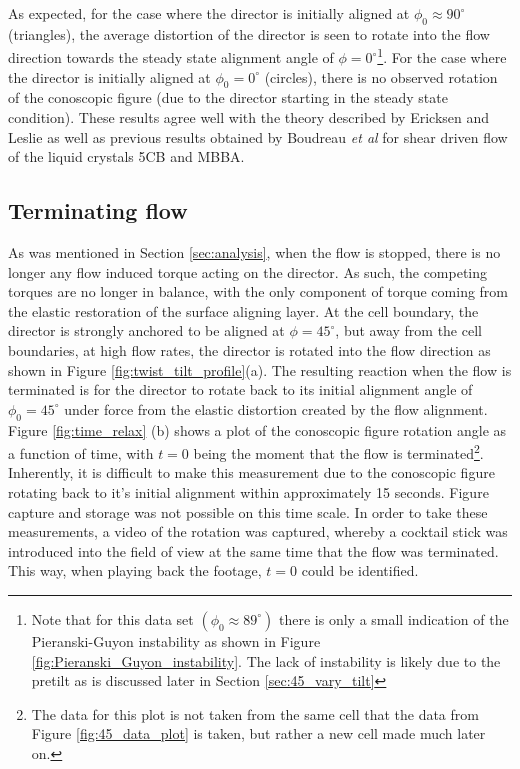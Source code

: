 As expected, for the case where the director is initially aligned at $\phi_0\approx90^{\circ}$ (triangles), the average distortion of the director is seen to rotate into the flow direction towards the steady state alignment angle of $\phi=0^{\circ}$\footnote{Note that for this data set $\left(\phi_0\approx89^{\circ}\right)$ there is only a small indication of the Pieranski-Guyon instability as shown in Figure \ref{fig:Pieranski_Guyon_instability}. The lack of instability is likely due to the pretilt as is discussed later in Section \ref{sec:45_vary_tilt}}. For the case where the director is initially aligned at $\phi_0=0^{\circ}$ (circles), there is no observed rotation of the conoscopic figure (due to the director starting in the steady state condition). These results agree well with the theory described by Ericksen and Leslie as well as previous results obtained by Boudreau \textit{et al} \cite{Boudreau1999} for shear driven flow of the liquid crystals 5CB and MBBA.



\subsection{Terminating flow}
\label{sec:stop_flow}
As was mentioned in Section \ref{sec:analysis}, when the flow is stopped, there is no longer any flow induced torque acting on the director. As such, the competing torques are no longer in balance, with the only component of torque coming from the elastic restoration of the surface aligning layer. At the cell boundary, the director is strongly anchored to be aligned at $\phi=45^{\circ}$, but away from the cell boundaries, at high flow rates, the director is rotated into the flow direction as shown in Figure \ref{fig:twist_tilt_profile}(a). The resulting reaction when the flow is terminated is for the director to rotate back to its initial alignment angle of $\phi_0=45^{\circ}$ under force from the elastic distortion created by the flow alignment. Figure \ref{fig:time_relax} (b) shows a plot of the conoscopic figure rotation angle as a function of time, with $t=0$ being the moment that the flow is terminated\footnote{The data for this plot is not taken from the same cell that the data from Figure \ref{fig:45_data_plot} is taken, but rather a new cell made much later on.}. Inherently, it is difficult to make this measurement due to the conoscopic figure rotating back to it's initial alignment within approximately 15 seconds. Figure capture and storage was not possible on this time scale. In order to take these measurements, a video of the rotation was captured, whereby a cocktail stick was introduced into the field of view at the same time that the flow was terminated. This way, when playing back the footage, $t=0$ could be identified.

